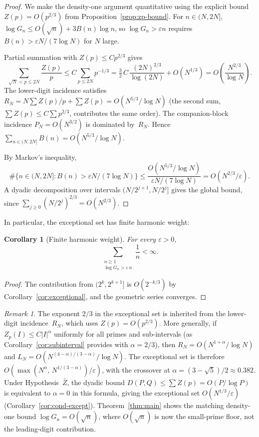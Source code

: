 \documentclass[11pt]{article}
\newtheorem{corollary}[theorem]{Corollary}
\theoremstyle{definition}
\theoremstyle{remark}
\newtheorem{remark}[theorem]{Remark}
\begin{document}
\begin{proof}
We make the density-one argument quantitative using
the explicit bound $Z(p) = O(p^{2/3})$ from
Proposition~\ref{prop:zp-bound}.
For $n \in (N, 2N]$, $\log G_n \le O(\sqrt{n}) + 3B(n)\log n$,
so $\log G_n > \varepsilon n$ requires
$B(n) > \varepsilon N/(7\log N)$ for $N$ large.

Partial summation with $Z(p) \le C p^{2/3}$ gives
\[
\sum_{\sqrt{N} < p \le 2N} \frac{Z(p)}{p}
\le C \sum_{p \le 2N} p^{-1/3}
= \tfrac{3}{2}\,C\,\frac{(2N)^{2/3}}{\log(2N)}
+ O(N^{1/3})
= O\!\left(\frac{N^{2/3}}{\log N}\right).
\]
The lower-digit incidence satisfies
$R_N = N \sum Z(p)/p + \sum Z(p) = O(N^{5/3}/\log N)$
(the second sum, $\sum Z(p) \le C\sum p^{2/3}$,
contributes the same order).
The companion-block incidence
$P_N = O(N^{3/2})$
is dominated by~$R_N$.
Hence $\sum_{n \in (N,2N]} B(n) = O(N^{5/3}/\log N)$.

By Markov's inequality,
\[
\#\bigl\{n \in (N,2N] : B(n) > \varepsilon N/(7\log N)\bigr\}
\le \frac{O(N^{5/3}/\log N)}{\varepsilon N/(7\log N)}
= O(N^{2/3}/\varepsilon).
\]
A dyadic decomposition over intervals $(N/2^{j+1}, N/2^j]$
gives the global bound, since
$\sum_{j \ge 0} (N/2^j)^{2/3} = O(N^{2/3})$.
\end{proof}

In particular, the exceptional set has finite harmonic weight:

\begin{corollary}[Finite harmonic weight]\label{cor:harmonic}
For every $\varepsilon > 0$,
\[
\sum_{\substack{n \ge 1 \\ \log G_n > \varepsilon\,n}}
\frac{1}{n} < \infty.
\]
\end{corollary}

\begin{proof}
The contribution from $(2^k, 2^{k+1}]$ is
$O(2^{-k/3})$ by Corollary~\ref{cor:exceptional},
and the geometric series converges.
\end{proof}

\begin{remark}\label{rem:exponent-link}
The exponent $2/3$ in the exceptional set is inherited
from the lower-digit incidence~$R_N$, which uses
$Z(p) = O(p^{2/3})$.
More generally, if $Z_p(I) \le C|I|^\alpha$
uniformly for all primes and sub-intervals
(as Corollary~\ref{cor:subinterval}
provides with $\alpha = 2/3$),
then $R_N = O(N^{1+\alpha}/\log N)$
and $L_N = O(N^{(4-\alpha)/(3-\alpha)}/\log N)$.
The exceptional set is therefore
$O(\max(N^\alpha,\, N^{1/(3-\alpha)})/\varepsilon)$,
with the crossover at
$\alpha = (3 - \sqrt{5})/2 \approx 0.382$.
Under Hypothesis~$\bar{Z}$, the dyadic bound
$D(P,Q) \le \sum Z(p) = O(P/\log P)$
is equivalent to $\alpha = 0$
in this formula, giving the
exceptional set $O(N^{1/3}/\varepsilon)$
(Corollary~\ref{cor:cond-except}).
Theorem~\ref{thm:main} shows the matching
density-one bound $\log G_n = O(\sqrt{n})$,
where $O(\sqrt{n})$ is now the
small-prime floor, not the leading-digit
contribution.
\end{remark}
\end{document}
